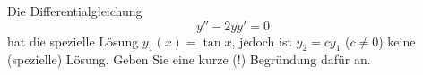 \begin{atiTask}[
	title = Weitere Fragen
]
	\providecommand{\D}{\mathrm{d}}
	\begin{atiSubtasks}

	\item Die Differentialgleichung
	\[
	y''-2yy'=0
	\]
	hat die spezielle Lösung $y_1(x)=\tan x$, jedoch ist $y_2=cy_1$ ($c\neq 0$) keine (spezielle) Lösung. Geben Sie eine kurze (!) Begründung dafür an.


\end{atiSubtasks}
\end{atiTask}
